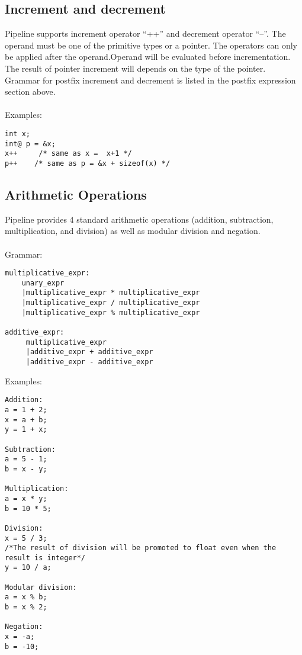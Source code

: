 \documentclass[./LRM_main.tex]{subfiles}
\begin{document}
\subsection{Increment and decrement}
Pipeline supports increment operator “++” and  decrement operator “--”. The operand must be one of the primitive types or a pointer. The operators can only be applied after the operand.Operand will be evaluated before incrementation.\\
The result of pointer increment will depends on the type of the pointer.\\
Grammar for postfix increment and decrement is listed in the postfix expression section above.\\
\vspace{1 mm}\\
Examples:
\begin{lstlisting}
int x;
int@ p = &x;
x++     /* same as x =  x+1 */
p++    /* same as p = &x + sizeof(x) */ 
\end{lstlisting}
\subsection{Arithmetic Operations}
Pipeline provides 4 standard arithmetic operations (addition, subtraction, multiplication, and division) as well as modular division and negation.\\
\vspace{1 mm}\\
Grammar:
\begin{lstlisting}
multiplicative_expr:
    unary_expr
    |multiplicative_expr * multiplicative_expr
    |multiplicative_expr / multiplicative_expr
    |multiplicative_expr % multiplicative_expr

additive_expr:
     multiplicative_expr
     |additive_expr + additive_expr
     |additive_expr - additive_expr

\end{lstlisting}
\pagebreak
Examples:
\begin{lstlisting}
Addition:
a = 1 + 2;
x = a + b;
y = 1 + x;

Subtraction:
a = 5 - 1;
b = x - y;

Multiplication:
a = x * y;
b = 10 * 5;

Division:
x = 5 / 3; 
/*The result of division will be promoted to float even when the result is integer*/
y = 10 / a;

Modular division:
a = x % b;
b = x % 2;

Negation:
x = -a;
b = -10;
\end{lstlisting}
\end{document}
